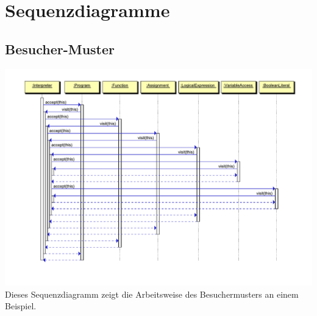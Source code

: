 \documentclass[10pt,a4paper,titlepage]{article}
\begin{document}
\section{Sequenzdiagramme}
\subsection{Besucher-Muster}
\includegraphics[scale=0.9]{images/Visitor_Pattern.pdf} \newline
Dieses Sequenzdiagramm zeigt die Arbeitsweise des Besuchermusters an einem Beispiel.
\end{document}
